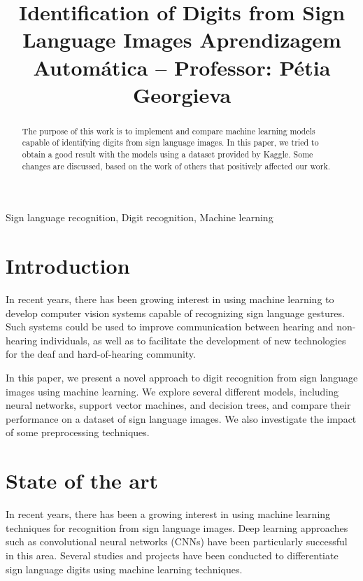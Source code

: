 \documentclass[conference]{IEEEtran}
\begin{document}
\title{Identification of Digits from Sign Language Images
{\small Aprendizagem Automática -- Professor: Pétia Georgieva}
}

\author{
\and
{}
}

\maketitle

\begin{abstract}
    The purpose of this work is to implement and
    compare machine learning models capable of identifying digits from sign language images.
    In this paper, we tried to obtain a good result with the models using
    a dataset provided by Kaggle. Some changes are discussed,
    based on the work of others that positively affected our
    work.
\end{abstract}

\begin{IEEEkeywords}
Sign language recognition, Digit recognition, Machine learning
\end{IEEEkeywords}

\section{Introduction}
In recent years, there has been growing interest in using machine learning to develop computer vision systems capable of recognizing sign language gestures. Such systems could be used to improve communication between hearing and non-hearing individuals, as well as to facilitate the development of new technologies for the deaf and hard-of-hearing community.

In this paper, we present a novel approach to digit recognition from sign language images using machine learning. We explore several different models, including neural networks, support vector machines, and decision trees, and compare their performance on a dataset of sign language images. We also investigate the impact of some preprocessing techniques.

\section{State of the art}
In recent years, there has been a growing interest in using machine learning techniques for recognition from sign language images. Deep learning approaches such as convolutional neural networks (CNNs) have been particularly successful in this area. Several studies and projects have been conducted to differentiate sign language digits using machine learning techniques.
\end{document}
